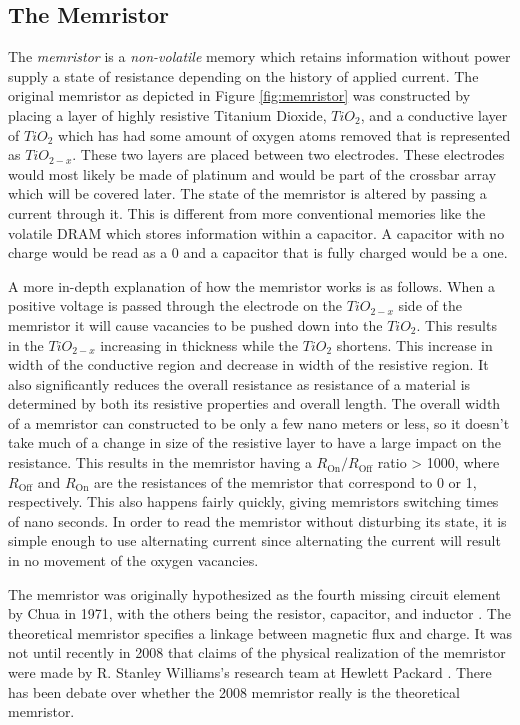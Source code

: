\documentclass{sig-alternate}
\begin{document}
\subsection{The Memristor}
\label{sec:memback}
The \textit{memristor} is a \textit{non-volatile} memory which retains information without power supply a state of resistance depending on the history of applied current.  The original memristor as depicted in Figure \ref{fig:memristor} was constructed by placing a layer of highly resistive Titanium Dioxide, $TiO_2$, and a conductive layer of $TiO_{2}$ which has had some amount of oxygen atoms removed that is represented as $TiO_{2-x}$.  These two layers are placed between two electrodes.  These electrodes would most likely be made of platinum and would be part of the crossbar array which will be covered later.  The state of the memristor is altered by passing a current through it.  This is different from more conventional memories like the volatile DRAM which stores information within a capacitor.  A capacitor with no charge would be read as a 0 and a capacitor that is fully charged would be a one.

	A more in-depth explanation of how the memristor works is as follows.  When a positive voltage is passed through the electrode on the $TiO_{2-x}$ side of the memristor it will cause vacancies to be pushed down into the $TiO_2$.  This results in the $TiO_{2-x}$ increasing in thickness while the $TiO_2$ shortens.  This increase in width of the conductive region and decrease in width of the resistive region.  It also significantly reduces the overall resistance as resistance of a material is determined by both its resistive properties and overall length.  The overall width of a memristor can constructed to be only a few nano meters or less, so it doesn't take much of a change in size of the resistive layer to have a large impact on the resistance.  This results in the memristor having a $R_{\textrm{On}}/R_\textrm{Off}$ ratio > 1000, where $R_{\textrm{Off}}$ and $R_{\textrm{On}}$ are the resistances of the memristor that correspond to 0 or 1, respectively.  This also happens fairly quickly, giving memristors switching times of nano seconds.  In order to read the memristor without disturbing its state, it is simple enough to use alternating current since alternating the current will result in no movement of the oxygen vacancies.

The memristor was originally hypothesized as the fourth missing circuit element by Chua in 1971, with the others being the resistor, capacitor, and inductor \cite{Chua}.  The theoretical memristor specifies a linkage between magnetic flux and charge.  It was not until recently in 2008 that claims of the physical realization of the memristor were made by R. Stanley Williams's research team at Hewlett Packard \cite{MemFound}.  There has been debate over whether the 2008 memristor really is the theoretical memristor.
\end{document}
